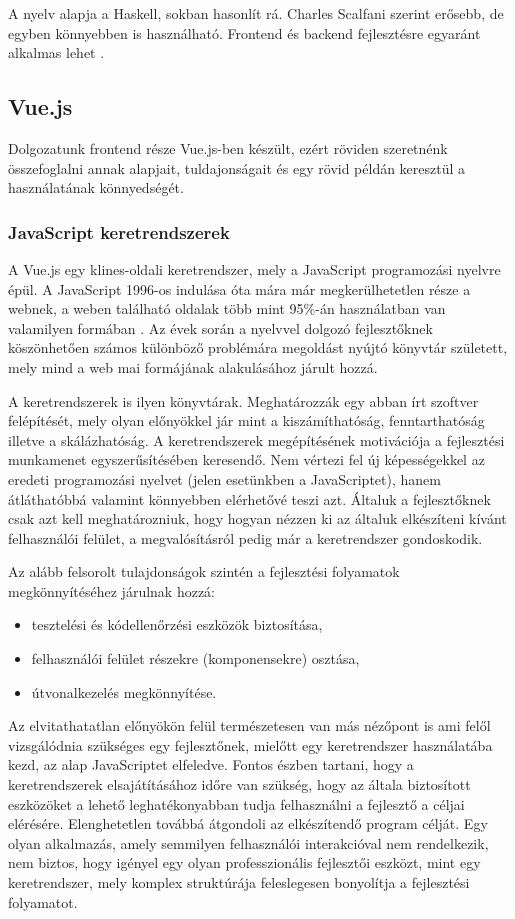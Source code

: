 \documentclass[12pt]{article}
\begin{document}
A nyelv alapja a Haskell, sokban hasonlít rá. Charles Scalfani \cite{CS} szerint erősebb, de egyben könnyebben is használható.
Frontend és backend fejlesztésre egyaránt alkalmas lehet \cite{CS}.

\subsection{Vue.js}

Dolgozatunk frontend része Vue.js-ben készült,  ezért röviden szeretnénk összefoglalni annak alapjait, tuldajonságait és egy rövid példán keresztül a használatának könnyedségét.

\subsubsection{JavaScript keretrendszerek}

A Vue.js egy klines-oldali keretrendszer, mely a JavaScript programozási nyelvre épül. A JavaScript 1996-os indulása óta mára már megkerülhetetlen része a webnek, a weben található oldalak több mint 95\%-án használatban van valamilyen formában \cite{JS_USAGE}. Az évek során a nyelvvel dolgozó fejlesztőknek köszönhetően számos különböző problémára megoldást nyújtó könyvtár született, mely mind a web mai formájának alakulásához járult hozzá.

A keretrendszerek is ilyen könyvtárak. Meghatározzák egy abban írt szoftver felépítését, mely olyan előnyökkel jár mint a kiszámíthatóság, fenntarthatóság illetve a skálázhatóság.
A keretrendszerek megépítésének motivációja a fejlesztési munkamenet egyszerűsítésében keresendő. Nem vértezi fel új képességekkel az eredeti programozási nyelvet (jelen esetünkben a JavaScriptet), hanem átláthatóbbá valamint könnyebben elérhetővé teszi azt. Általuk a fejlesztőknek csak azt kell meghatározniuk, hogy hogyan nézzen ki az általuk elkészíteni kívánt felhasználói felület, a megvalósításról pedig már a keretrendszer gondoskodik.

Az alább felsorolt tulajdonságok szintén a fejlesztési folyamatok megkönnyítéséhez járulnak hozzá:
\begin{itemize}
\item tesztelési és kódellenőrzési eszközök biztosítása,
\item felhasználói felület részekre (komponensekre) osztása,
\item útvonalkezelés megkönnyítése.
\end{itemize}

Az elvitathatatlan előnyökön felül természetesen van más nézőpont is ami felől vizsgálódnia szükséges egy fejlesztőnek, mielőtt egy keretrendszer használatába kezd, az alap JavaScriptet elfeledve. Fontos észben tartani, hogy a keretrendszerek elsajátításához időre van szükség, hogy az általa biztosított eszközöket a lehető leghatékonyabban tudja felhasználni a fejlesztő a céljai elérésére. Elenghetetlen továbbá átgondoli az elkészítendő program célját. Egy olyan alkalmazás, amely semmilyen felhasználói interakcióval nem rendelkezik, nem biztos, hogy igényel egy olyan professzionális fejlesztői eszközt, mint egy keretrendszer, mely komplex struktúrája feleslegesen bonyolítja a fejlesztési folyamatot.
\end{document}
